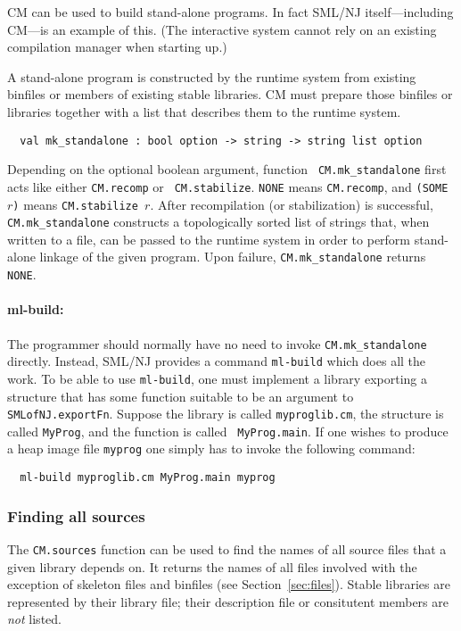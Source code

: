 \documentclass[titlepage,letterpaper]{article}
\begin{document}
CM can be used to build stand-alone programs. In fact SML/NJ
itself---including CM---is an example of this.  (The interactive
system cannot rely on an existing compilation manager when starting
up.)

A stand-alone program is constructed by the runtime system from
existing binfiles or members of existing stable libraries.  CM must
prepare those binfiles or libraries together with a list that
describes them to the runtime system.

\begin{verbatim}
  val mk_standalone : bool option -> string -> string list option
\end{verbatim}

Depending on the optional boolean argument, function {\tt
CM.mk\_standalone} first acts like either {\tt CM.recomp} or {\tt
CM.stabilize}.  {\tt NONE} means {\tt CM.recomp}, and {\tt (SOME $r$)}
means {\tt CM.stabilize $r$}.  After recompilation (or stabilization)
is successful, {\tt CM.mk\_standalone} constructs a topologically
sorted list of strings that, when written to a file, can be passed to the
runtime system in order to perform stand-alone linkage of the given
program. Upon failure, {\tt CM.mk\_standalone} returns {\tt NONE}.

\paragraph*{\bf ml-build:} The programmer should normally have no need
to invoke {\tt CM.mk\_standalone} directly.  Instead, SML/NJ provides
a command {\tt ml-build} which does all the work.  To be able to use
{\tt ml-build}, one must implement a library exporting a structure
that has some function suitable to be an argument to {\tt
SMLofNJ.exportFn}.  Suppose the library is called {\tt myproglib.cm}, the
structure is called {\tt MyProg}, and the function is called {\tt
MyProg.main}.  If one wishes to produce a heap image file {\tt myprog}
one simply has to invoke the following command:

\begin{verbatim}
  ml-build myproglib.cm MyProg.main myprog
\end{verbatim}

\subsubsection*{Finding all sources}

The {\tt CM.sources} function can be used to find the names of all
source files that a given library depends on.  It returns the names of
all files involved with the exception of skeleton files and binfiles
(see Section~\ref{sec:files}).  Stable libraries are represented by
their library file; their description file or consitutent members are
{\em not} listed.
\end{document}
